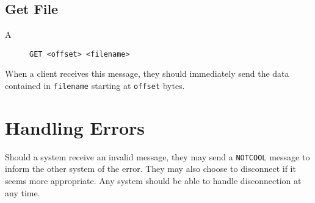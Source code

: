 \documentclass{article}
\begin{document}
\subsection{Get File}
\begin{description}
\item[A] \verb+GET <offset> <filename>+
\end{description}

When a client receives this message, they should immediately send the data contained in \verb+filename+ starting at \verb+offset+ bytes.

\section{Handling Errors}
Should a system receive an invalid message, they may send a \verb+NOTCOOL+ message to inform the other system of the error.  They may also choose to disconnect if it seems more appropriate.  Any system should be able to handle disconnection at any time.
\end{document}
